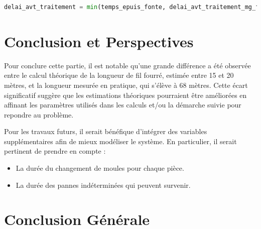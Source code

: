 \documentclass[12pt]{article}
\begin{document}
\begin{lstlisting}[language=Python, caption=Calcul du délai avant traitement optimal]
delai_avt_traitement = min(temps_epuis_fonte, delai_avt_traitement_mg_four)
\end{lstlisting}


\section*{Conclusion et Perspectives}

Pour conclure cette partie, il est notable qu'une grande différence a 
été observée entre le calcul théorique de la longueur de fil fourré, 
estimée entre 15 et 20 mètres, et la longueur mesurée en pratique, qui 
s'élève à 68 mètres. Cette écart significatif suggère que les estimations 
théoriques pourraient être améliorées en affinant les paramètres utilisés 
dans les calculs et/ou la démarche suivie pour repondre au problème.

Pour les travaux futurs, il serait bénéfique d'intégrer des variables 
supplémentaires afin de mieux modéliser le système. En particulier, il 
serait pertinent de prendre en compte :
\begin{itemize}
    \item La durée du changement de moules pour chaque pièce.
    \item La durée des pannes indéterminées qui peuvent survenir.
\end{itemize}


    



\section{Conclusion Générale}
\end{document}
